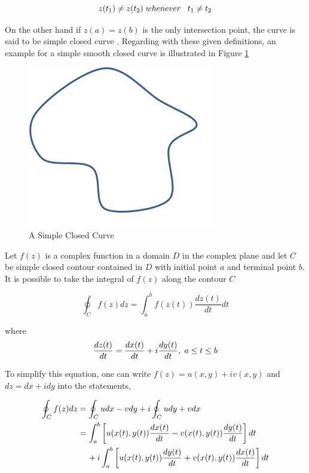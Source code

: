 \begin{equation} \label{crossitself}
z(t_1) \neq z(t_2)   \hspace{0.1cm} whenever   \hspace{0.3cm} t_1\neq t_2
\end{equation}
		
On the other hand if  $z(a)=z(b)$ is the only intersection point, the curve is said to be simple closed curve \cite{wiki_contour}. Regarding with these given definitions, an example for a  simple smooth closed curve is illustrated in Figure \ref{simple_closed_curve_ref}

\begin{figure}[H]
\caption{A Simple Closed Curve} \label{simple_closed_curve_ref}
\centering
\includegraphics[scale = 0.60]{simple_closed_curve}
\end{figure}
		
Let $f(z)$ is a complex function in a domain $D$ in the complex plane and let $C$ be simple closed contour contained in $D$ with initial point $a$ and terminal point  $b$. It is possible to take the integral of $f(z)$ along the contour $C$ \cite{wiki_contour}
		
\begin{equation}
\oint_C f(z) dz = \int_{a}^{b} f(z(t))\frac{dz(t)}{dt} dt
\end{equation}
		
where
\begin{equation}
\frac{dz(t)}{dt} = \frac{dx(t)}{dt} + i\frac{dy(t)}{dt},   \hspace{0.1cm} a\leq t\leq b
\end{equation}
		
To simplify this equation, one can write $f(z) = u(x,y) + iv(x,y)$ and $dz = dx + idy$ into the statements,
		
\begin{align} \label{contour_integral}
\begin{split}
\oint_C f(z)dz & = \oint_C u dx - v dy + i \oint_C u dy + v dx \\
&= \int_{a}^{b}\left[u(x(t),y(t) )\frac{dx(t)}{dt} - v(x(t),y(t) )\frac{dy(t)}{dt}\right]dt\\
& \hspace{0.4cm} + i\int_{a}^{b} \left[u(x(t),y(t) )\frac{dy(t)}{dt} + v(x(t),y(t) )\frac{dx(t)}{dt}\right]dt
\end{split}
\end{align}

